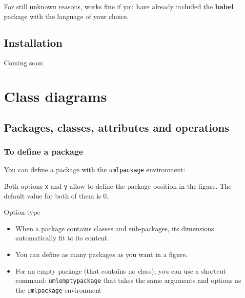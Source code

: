 \documentclass[a4paper,11pt]{report}
\begin{document}
For still unknown reasons, \tuml works fine if you have already included the {\bf babel} package with the language of your choice.

\section{Installation}

Coming soon

\chapter{Class diagrams}\label{c.class}

\section{Packages, classes, attributes and operations}\label{s.packageclass}

\subsection{To define a package}\label{ss.package}

You can define a package with the {\tt umlpackage} environment:

\medskip

\begin{minipage}{0.5\textwidth}

\end{minipage}
\begin{minipage}{0.4\textwidth}
\begin{center}
\end{center}
\end{minipage}

\medskip

Both options {\tt x} and {\tt y} allow to define the package position in the figure. 
The default value for both of them is 0.

\begin{minipage}{0.5\textwidth}

\end{minipage}
\begin{minipage}{0.4\textwidth}
\begin{center}
\end{center}
\end{minipage}

Option type

\begin{itemize}
\item When a package contains classes and sub-packages, its dimensions automatically fit to its content.
\item You can define as many packages as you want in a figure.
\item For an empty package (that contains no class), you can use a shortcut command: {\tt umlemptypackage} that takes the same arguments and options as the {\tt umlpackage} environment
\end{itemize}
\end{document}
